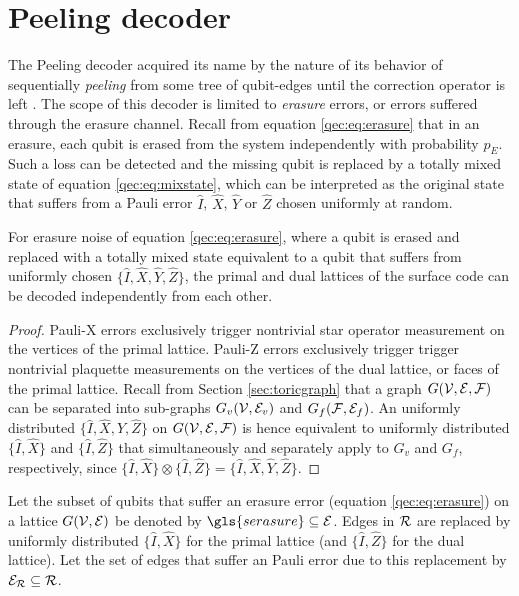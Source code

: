 \section{Peeling decoder}\label{sec:peelingdecoder}
The Peeling decoder acquired its name by the nature of its behavior of sequentially \emph{peeling} from some tree of qubit-edges until the correction operator is left \cite{delfosse2017linear}. The scope of this decoder is limited to \emph{erasure} errors, or errors suffered through the erasure channel. Recall from equation \eqref{qec:eq:erasure} that in an erasure, each qubit is erased from the system independently with probability $p_E$. Such a loss can be detected and the missing qubit is replaced by a totally mixed state of equation \eqref{qec:eq:mixstate}, which can be interpreted as the original state that suffers from a Pauli error $\hat{I}$, $\hat{X}$, $\hat{Y}$ or $\hat{Z}$ chosen uniformly at random.
\begin{theorem}\label{the:independentxy}
  For erasure noise of equation \eqref{qec:eq:erasure}, where a qubit is erased and replaced with a totally mixed state equivalent to a qubit that suffers from uniformly chosen $\{\hat{I},\hat{X},\hat{Y},\hat{Z}\}$, the primal and dual lattices of the surface code can be decoded independently from each other.
\end{theorem}
\begin{proof}
  Pauli-X errors exclusively trigger nontrivial star operator measurement on the vertices of the primal lattice. Pauli-Z errors exclusively trigger trigger nontrivial plaquette measurements on the vertices of the dual lattice, or faces of the primal lattice. Recall from Section \ref{sec:toricgraph} that a graph $G(\mathcal{V},\mathcal{E},\mathcal{F})$ can be separated into sub-graphs $G_v(\mathcal{V},\mathcal{E}_v)$ and $G_f(\mathcal{F},\mathcal{E}_f)$. An uniformly distributed $\{\hat{I},\hat{X},\hat{Y},\hat{Z}\}$ on $G(\mathcal{V},\mathcal{E},\mathcal{F})$ is hence equivalent to uniformly distributed $\{\hat{I}, \hat{X}\}$ and $\{\hat{I}, \hat{Z}\}$ that simultaneously and separately apply to $G_v$ and $G_f$, respectively, since $\{\hat{I}, \hat{X}\} \otimes \{\hat{I}, \hat{Z}\}=\{\hat{I},\hat{X},\hat{Y},\hat{Z}\}$.
\end{proof}
\begin{definition}\label{def:erasure}
  Let the subset of qubits that suffer an erasure error (equation \eqref{qec:eq:erasure}) on a lattice $G(\mathcal{V},\mathcal{E})$ be denoted by $\gls{serasure}\subseteq \m{E}$. Edges in $\mathcal{R}$ are replaced by uniformly distributed $\{\hat{I}, \hat{X}\}$ for the primal lattice (and $\{\hat{I}, \hat{Z}\}$ for the dual lattice). Let the set of edges that suffer an Pauli error due to this replacement by $\mathcal{E}_{\mathcal{R}}\subseteq \mathcal{R}$.
\end{definition}
